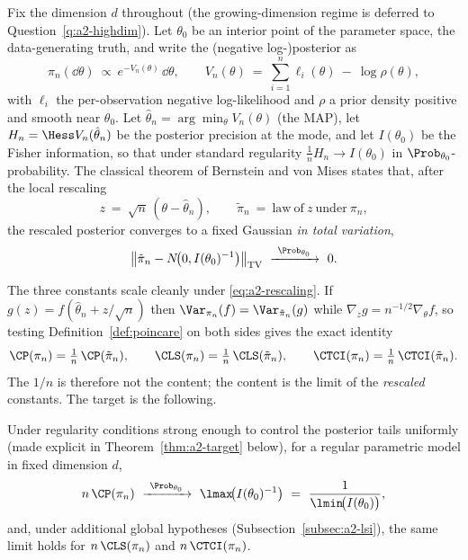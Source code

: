 \documentclass[../../main.tex]{subfiles}
\begin{document}
Fix the dimension $d$ throughout (the growing-dimension regime is deferred to
Question~\ref{q:a2-highdim}). Let $\theta_0$ be an interior point of the parameter space, the
data-generating truth, and write the (negative log-)posterior as
\[
  \pi_n(\dd\theta)\ \propto\ e^{-V_n(\theta)}\,\dd\theta,
  \qquad
  V_n(\theta)\ =\ \sum_{i=1}^n \ell_i(\theta)\ -\ \log\rho(\theta),
\]
with $\ell_i$ the per-observation negative log-likelihood and $\rho$ a prior density positive
and smooth near $\theta_0$. Let $\hat\theta_n=\arg\min_\theta V_n(\theta)$ (the MAP), let
$H_n=\Hess V_n(\hat\theta_n)$ be the posterior precision at the mode, and let $I(\theta_0)$ be
the Fisher information, so that under standard regularity $\tfrac1n H_n\to I(\theta_0)$ in
$\Prob_{\theta_0}$-probability. The classical theorem of Bernstein and von Mises
\cite{VanDerVaart1998,GhosalVanDerVaart2017} states that, after the local rescaling
\begin{equation}\label{eq:a2-rescaling}
  z\ =\ \sqrt n\,(\theta-\hat\theta_n),
  \qquad
  \tilde\pi_n\ =\ \mathrm{law\ of}\ z\ \mathrm{under}\ \pi_n,
\end{equation}
the rescaled posterior converges to a fixed Gaussian \emph{in total variation},
\begin{equation}\label{eq:a2-bvm}
  \big\|\tilde\pi_n-N\!\big(0,I(\theta_0)^{-1}\big)\big\|_{\mathrm{TV}}\ \xrightarrow{\ \Prob_{\theta_0}\ }\ 0 .
\end{equation}

The three constants scale cleanly under \eqref{eq:a2-rescaling}. If $g(z)=f(\hat\theta_n+z/\sqrt n)$
then $\Var_{\pi_n}(f)=\Var_{\tilde\pi_n}(g)$ while $\nabla_z g=n^{-1/2}\nabla_\theta f$, so testing
Definition~\ref{def:poincare} on both sides gives the exact identity
\begin{equation}\label{eq:a2-scaling}
  \CP(\pi_n)=\tfrac1n\,\CP(\tilde\pi_n),\qquad
  \CLS(\pi_n)=\tfrac1n\,\CLS(\tilde\pi_n),\qquad
  \CTCI(\pi_n)=\tfrac1n\,\CTCI(\tilde\pi_n).
\end{equation}
The $1/n$ is therefore not the content; the content is the limit of the \emph{rescaled}
constants. The target is the following.

\begin{conjecture}
\label{conj:a2}
Under regularity conditions strong enough to control the posterior tails uniformly (made
explicit in Theorem~\ref{thm:a2-target} below), for a regular parametric model in fixed
dimension $d$,
\begin{equation}\label{eq:a2-target}
  n\,\CP(\pi_n)\ \xrightarrow{\ \Prob_{\theta_0}\ }\ \lmax\!\big(I(\theta_0)^{-1}\big)
  \ =\ \frac{1}{\lmin\!\big(I(\theta_0)\big)} ,
\end{equation}
and, under additional global hypotheses (Subsection~\ref{subsec:a2-lsi}), the same limit holds
for $n\,\CLS(\pi_n)$ and $n\,\CTCI(\pi_n)$.
\end{conjecture}
\end{document}
